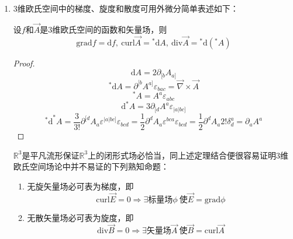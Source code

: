 \begin{enumerate}[（1）]
    \begin{proof}
        右边第一项$= A_a\partial^aB^b$

        右边第二项$= B_a\partial^aA^b$
        \[\begin{split}
            \text{右边第三项} & = \vec A \times (\varepsilon^{cde}\partial_dB_e) = \varepsilon^{bac}A_a(\varepsilon_{cde}\partial^dB^e) \\
            & = 2\delta^b_{[d}\delta^a_{e]}A_a\partial^dB^e = (\delta^b_d\delta^a_e - \delta^b_e\delta^a_d)A_a\partial^dB^e = A_a\partial^bB^a - A_a\partial^aB^b
        \end{split}\]
        同理，右边第四项$= B_a\partial^bA^a - B_a\partial^aA^b$
        
        故，右边$= A_a\partial^bB^a + B_a\partial^bA^a = \partial^b(A_aB^a) = \vec\nabla(\vec A \cdot \vec B)$
    \end{proof}
    \item $3$维欧氏空间中的梯度、旋度和散度可用外微分简单表述如下：
    \begin{theorem}
        设$f$和$\vec A$是$3$维欧氏空间的函数和矢量场，则
        $$\mathrm{grad} f = \mathrm{d}f, ~ \mathrm{curl} \vec A = \mathrm{^*d}A, ~ \mathrm{div} \vec A = \mathrm{^*d}(^*A)$$
    \end{theorem}
    \begin{proof}
        $$\mathrm{d}A = 2\partial_{[b}A_{a]}$$
        $$\mathrm{^*d}A = \partial^{[b}A^{a]}\varepsilon_{bac} = \vec\nabla \times \vec A$$
        $$^*A = A^a\varepsilon_{abc}$$
        $$\mathrm{d}^*A = 3\partial_{[d}A^a\varepsilon_{|a|bc]}$$
        $$\mathrm{^*d}^*A = \frac{3}{3!}\partial^{[d}A_a\varepsilon^{|a|bc]}\varepsilon_{bcd} = \frac{1}{2}\partial^dA_a\varepsilon^{bca}\varepsilon_{bcd} = \frac{1}{2}\partial^dA_a2!\delta^a_d = \partial_aA^a$$
    \end{proof}

    $\mathbb{R}^3$是平凡流形保证$\mathbb{R}^3$上的闭形式场必恰当，同上述定理结合便很容易证明$3$维欧氏空间场论中并不易证的下列熟知命题：
    \begin{enumerate}[（1）]
        \item 无旋矢量场必可表为梯度，即
        $$\mathrm{curl}\vec E = 0 \Rightarrow \exists \text{标量场}\phi ~ \text{使} \vec E = \mathrm{grad}\phi$$
        \item 无散矢量场必可表为旋度，即
        $$\mathrm{div}\vec B = 0 \Rightarrow \exists \text{矢量场}\vec A ~ \text{使} \vec B = \mathrm{curl}\vec A$$
    \end{enumerate}


\end{enumerate}
